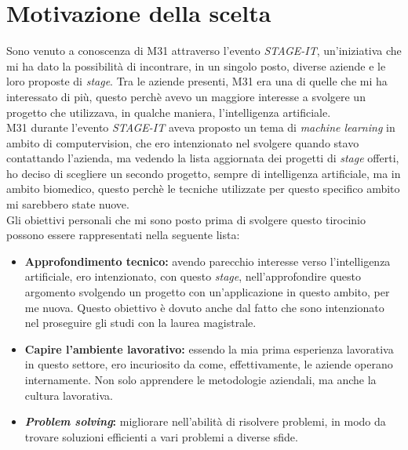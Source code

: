 \section{Motivazione della scelta}\label{sec:choice-motivation}\noindent
Sono venuto a conoscenza di M31 attraverso l'evento \textit{STAGE-IT}, un'iniziativa che mi ha dato la possibilità di incontrare, in un singolo posto, diverse aziende e le loro proposte di \textit{stage}.
Tra le aziende presenti, M31 era una di quelle che mi ha interessato di più, questo perchè avevo un maggiore interesse a svolgere un progetto che utilizzava, in qualche maniera, l'intelligenza artificiale.\\
M31 durante l'evento \textit{STAGE-IT} aveva proposto un tema di \textit{machine learning} in ambito di \gls{computervision}, che ero intenzionato nel svolgere quando stavo contattando l'azienda, ma vedendo la lista aggiornata dei progetti di \textit{stage} offerti, ho deciso di scegliere un secondo progetto, sempre di intelligenza artificiale, ma in ambito biomedico, questo perchè le tecniche utilizzate per questo specifico ambito mi sarebbero state nuove.\\
Gli obiettivi personali che mi sono posto prima di svolgere questo tirocinio possono essere rappresentati nella seguente lista:
\begin{itemize}
    \item \textbf{Approfondimento tecnico:} avendo parecchio interesse verso l'intelligenza artificiale, ero intenzionato, con questo \textit{stage}, nell'approfondire questo argomento svolgendo un progetto con un'applicazione in questo ambito, per me nuova. Questo obiettivo è dovuto anche dal fatto che sono intenzionato nel proseguire gli studi con la laurea magistrale.
    \item \textbf{Capire l'ambiente lavorativo:} essendo la mia prima esperienza lavorativa in questo settore, ero incuriosito da come, effettivamente, le aziende operano internamente. Non solo apprendere le metodologie aziendali, ma anche la cultura lavorativa.
    \item \textbf{\textit{Problem solving}:} migliorare nell'abilità di risolvere problemi, in modo da trovare soluzioni efficienti a vari problemi a diverse sfide.
\end{itemize}